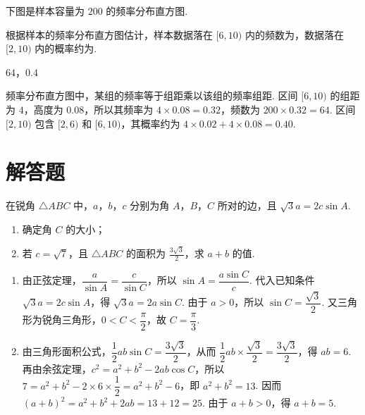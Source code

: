 \begin{problem}
下图是样本容量为 \(200\) 的频率分布直方图.


根据样本的频率分布直方图估计，样本数据落在 \([6,10)\) 内的频数为\fillinblank{}，数据落在 \([2,10)\) 内的概率约为\fillinblank{}.
\end{problem}

\begin{answer}
64，0.4
\end{answer}

\begin{solution}
频率分布直方图中，某组的频率等于组距乘以该组的频率组距. 区间 \([6,10)\) 的组距为 \(4\)，高度为 \(0.08\)，所以其频率为 \(4\times0.08=0.32\)，频数为 \(200\times0.32=64\). 区间 \([2,10)\) 包含 \([2,6)\) 和 \([6,10)\)，其概率约为 \(4\times0.02+4\times0.08=0.40\).
\end{solution}

\section{解答题}

\begin{problem}
在锐角 \(\triangle ABC\) 中，\(a\)，\(b\)，\(c\) 分别为角 \(A\)，\(B\)，\(C\) 所对的边，且 \(\sqrt{3} a = 2c \sin A\).

\begin{enumerate}
\item 确定角 \(C\) 的大小；
\item 若 \(c = \sqrt{7}\)，且 \(\triangle ABC\) 的面积为 \(\frac{3\sqrt{3}}{2}\)，求 \(a + b\) 的值.
\end{enumerate}
\end{problem}

\begin{solution}
\begin{enumerate}
\item 由正弦定理，\(\dfrac{a}{\sin A}=\dfrac{c}{\sin C}\)，所以 \(\sin A=\dfrac{a\sin C}{c}\). 代入已知条件 \(\sqrt3a=2c\sin A\)，得 \(\sqrt3a=2a\sin C\). 由于 \(a>0\)，所以 \(\sin C=\dfrac{\sqrt3}{2}\). 又三角形为锐角三角形，\(0<C<\dfrac{\pi}{2}\)，故 \(C=\dfrac{\pi}{3}\).
\item 由三角形面积公式，\(\dfrac12ab\sin C=\dfrac{3\sqrt3}{2}\)，从而 \(\dfrac12ab\times\dfrac{\sqrt3}{2}=\dfrac{3\sqrt3}{2}\)，得 \(ab=6\). 再由余弦定理，\(c^2=a^2+b^2-2ab\cos C\)，所以 \(7=a^2+b^2-2\times6\times\dfrac12=a^2+b^2-6\)，即 \(a^2+b^2=13\). 因而 \((a+b)^2=a^2+b^2+2ab=13+12=25\). 由于 \(a+b>0\)，得 \(a+b=5\).
\end{enumerate}
\end{solution}

